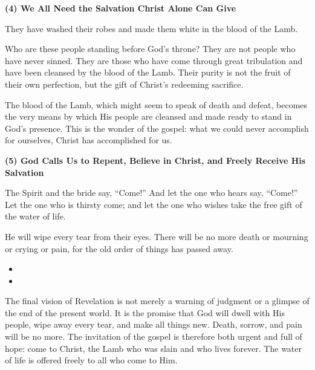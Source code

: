 \begin{center}
\begin{tcolorbox}
\vspace{0.3cm}

\textbf{(4) We All Need the Salvation Christ Alone Can Give}

\begin{ScriptureBox}
\item[7:14] They have washed their robes and made them white in the blood of the Lamb.
\end{ScriptureBox}

Who are these people standing before God's throne? They are not people who have never sinned. They are those who have come through great tribulation and have been cleansed by the blood of the Lamb. Their purity is not the fruit of their own perfection, but the gift of Christ's redeeming sacrifice.

The blood of the Lamb, which might seem to speak of death and defeat, becomes the very means by which His people are cleansed and made ready to stand in God's presence. This is the wonder of the gospel: what we could never accomplish for ourselves, Christ has accomplished for us.

\vspace{0.3cm}

\textbf{(5) God Calls Us to Repent, Believe in Christ, and Freely Receive His Salvation}

\begin{ScriptureBox}
\item[22:17] The Spirit and the bride say, ``Come!'' And let the one who hears say, ``Come!'' Let the one who is thirsty come; and let the one who wishes take the free gift of the water of life.
\item[21:4] He will wipe every tear from their eyes. There will be no more death or mourning or crying or pain, for the old order of things has passed away.
\end{ScriptureBox}

\begin{itemize}[leftmargin=2em, labelsep=0.3em]
\item[Q.] 
\item[Q.] 
\end{itemize}

The final vision of Revelation is not merely a warning of judgment or a glimpse of the end of the present world. It is the promise that God will dwell with His people, wipe away every tear, and make all things new. Death, sorrow, and pain will be no more. The invitation of the gospel is therefore both urgent and full of hope: come to Christ, the Lamb who was slain and who lives forever. The water of life is offered freely to all who come to Him.

\end{tcolorbox}
\end{center}
